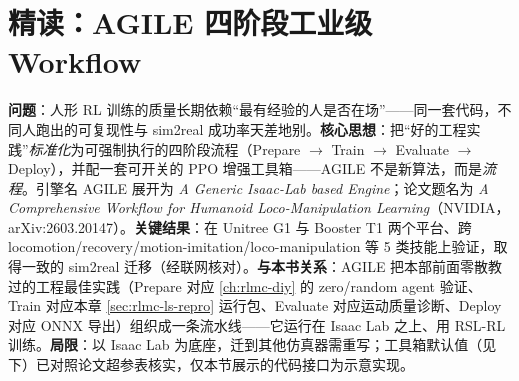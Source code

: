 
\begin{practice}[实验管理练习]
\end{practice}

\section{精读：AGILE 四阶段工业级 Workflow}
\label{sec:rlmc-ls-agile}

\begin{paper}\label{paper:rlmc-ls-agile}
\textbf{问题}：人形 RL 训练的质量长期依赖“最有经验的人是否在场”——同一套代码，不同人跑出的可复现性与 sim2real 成功率天差地别。\textbf{核心思想}：把“好的工程实践”\emph{标准化}为可强制执行的四阶段流程（Prepare $\to$ Train $\to$ Evaluate $\to$ Deploy），并配一套可开关的 PPO 增强工具箱——AGILE 不是新算法，而是\emph{流程}。引擎名 AGILE 展开为 \emph{A Generic Isaac-Lab based Engine}；论文题名为 \emph{A Comprehensive Workflow for Humanoid Loco-Manipulation Learning}（NVIDIA，arXiv:2603.20147）\cite{zhao2026agile}。\textbf{关键结果}：在 Unitree G1 与 Booster T1 两个平台、跨 locomotion/recovery/motion-imitation/loco-manipulation 等 5 类技能上验证，取得一致的 sim2real 迁移（经联网核对）。\textbf{与本书关系}：AGILE 把本部前面零散教过的工程最佳实践（Prepare 对应 \cref{ch:rlmc-diy} 的 zero/random agent 验证、Train 对应本章 \cref{sec:rlmc-ls-repro} 运行包、Evaluate 对应运动质量诊断、Deploy 对应 ONNX 导出）组织成一条流水线——它运行在 Isaac Lab 之上、用 RSL-RL 训练。\textbf{局限}：以 Isaac Lab 为底座，迁到其他仿真器需重写；工具箱默认值（见下）已对照论文超参表核实，仅本节展示的代码接口为示意实现。
\end{paper}

